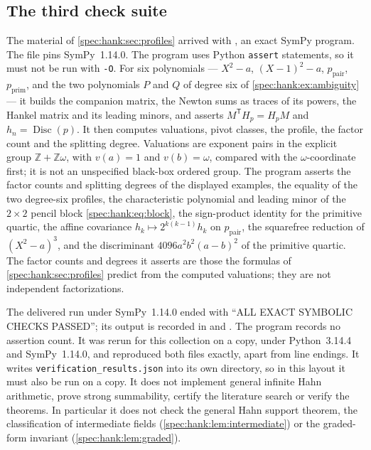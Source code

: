 \documentclass[11pt,a4paper]{article}
\numberwithin{equation}{section}
\theoremstyle{definition}
\theoremstyle{remark}
\newcommand{\Z}{\mathbb Z}
\newcommand{\Disc}{\operatorname{Disc}}
\begin{document}
\subsection*{The third check suite}
The material of \cref{spec:hank:sec:profiles} arrived with
, an exact SymPy
program. The file
 pins SymPy~1.14.0. The
program uses Python
\texttt{assert} statements, so it must not be run with \texttt{-O}. For six
polynomials --- $X^2-a$, $(X-1)^2-a$, $p_{\mathrm{pair}}$, $p_{\mathrm{prim}}$,
and the two polynomials $P$ and $Q$ of degree six of
\cref{spec:hank:ex:ambiguity} --- it builds the companion matrix, the Newton
sums as traces of its powers, the Hankel matrix and its leading minors, and
asserts $M^{\mathsf T}H_p=H_pM$ and $h_n=\Disc(p)$. It then computes
valuations, pivot classes, the profile, the factor count and the splitting
degree. Valuations are exponent pairs in the explicit group $\Z+\Z\omega$,
with $v(a)=1$ and $v(b)=\omega$, compared with the $\omega$-coordinate first;
it is not an unspecified black-box ordered group. The program asserts the
factor counts and splitting degrees of the displayed examples, the equality
of the two degree-six profiles, the characteristic polynomial and leading
minor of the $2\times2$ pencil block \eqref{spec:hank:eq:block}, the
sign-product identity for the primitive quartic, the affine covariance
$h_k\mapsto2^{k(k-1)}h_k$ on $p_{\mathrm{pair}}$, the squarefree reduction of
$(X^2-a)^3$, and the discriminant $4096a^2b^2(a-b)^2$ of the primitive
quartic. The factor counts and degrees it asserts are those the formulas of
\cref{spec:hank:sec:profiles} predict from the computed valuations; they are
not independent factorizations.

The delivered run under SymPy~1.14.0 ended with ``ALL EXACT SYMBOLIC CHECKS
PASSED''; its output is recorded in
 and
. The program
records no assertion count. It was rerun for this collection on a copy,
under Python~3.14.4 and SymPy~1.14.0, and reproduced both files exactly,
apart from line endings. It writes \texttt{verification\_results.json} into
its own directory, so in this layout it must also be run on a copy. It does
not implement general infinite Hahn arithmetic, prove strong summability,
certify the literature search or verify the theorems. In particular it does
not check the general Hahn support theorem, the classification of
intermediate fields (\cref{spec:hank:lem:intermediate}) or the graded-form
invariant (\cref{spec:hank:lem:graded}).
\end{document}
